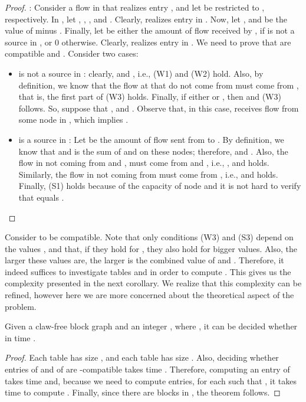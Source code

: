 \documentclass{llncs}
\begin{document}
\begin{proof}
: Consider a flow in  that realizes entry , and let  be  restricted to , respectively. In , let , , , and . Clearly,  realizes entry  in . Now, let , and  be the value of  minus . Finally, let  be either the amount of flow received by , if  is not a source in , or 0 otherwise. Clearly,  realizes entry  in . We need to prove that  are compatible and . Consider two cases: 

\begin{itemize}
  \item  is not a source in : clearly,  and , i.e., (W1) and (W2) hold. Also, by definition, we know that the flow at  that do not come from  must come from , that is, the first part of (W3) holds. Finally, if either  or , then  and (W3) follows. So, suppose that , and . Observe that, in this case,  receives flow from some node in , which implies .
  
  \item  is a source in : Let  be the amount of flow sent from  to . By definition, we know that  and  is the sum of  and  on these nodes; therefore,  and . Also, the flow in  not coming from  and , must come from  and , i.e., , and  holds. Similarly, the flow in  not coming from  must come from , i.e.,  and  holds. Finally, (S1) holds because of the capacity of node  and it is not hard to verify that  equals .
\end{itemize}
\end{proof}

Consider  to be  compatible. Note that only conditions (W3) and (S3) depend on the values , and that, if they hold for , they also hold for bigger values. Also, the larger these values are, the larger is the combined value of  and . Therefore, it indeed suffices to investigate tables  and  in order to compute . This gives us the complexity presented in the next corollary. We realize that this complexity can be refined, however here we are more concerned about the theoretical aspect of the problem.

\begin{corollary}
Given a claw-free block graph  and an integer , where , it can be decided whether  in time . 
\end{corollary}
\begin{proof}
Each table  has size , and each table  has size . Also, deciding whether entries  of  and  of  are -compatible takes time . Therefore, computing an entry  of  takes time  and, because we need to compute  entries, for each  such that , it takes time  to compute . Finally, since there are  blocks in , the theorem follows.
\end{proof}
\end{document}
